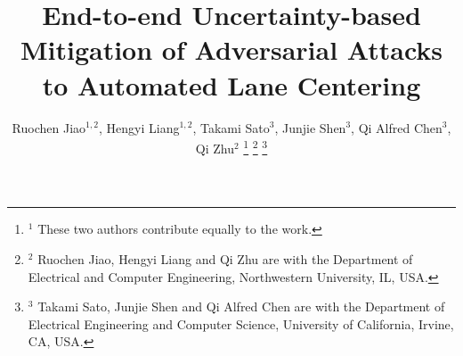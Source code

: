 \documentclass[letterpaper, 10 pt, conference]{ieeeconf}
\begin{document}
\title{\LARGE \bf End-to-end Uncertainty-based Mitigation of Adversarial Attacks to Automated Lane Centering\\
}


\author{Ruochen Jiao$^{1,2}$, Hengyi Liang$^{1,2}$, Takami Sato$^{3}$, Junjie Shen$^{3}$, Qi Alfred Chen$^{3}$, Qi Zhu$^{2}$%
\thanks{$^{1}$ These two authors contribute equally to the work.}%
\thanks{$^{2}$ Ruochen Jiao, Hengyi Liang and Qi Zhu are with the Department of Electrical and Computer Engineering, Northwestern University, IL, USA.}%
\thanks{$^{3}$ Takami  Sato, Junjie Shen and Qi Alfred Chen are with the Department of Electrical Engineering and Computer Science, University of California, Irvine, CA, USA.}%
}

\end{document}
